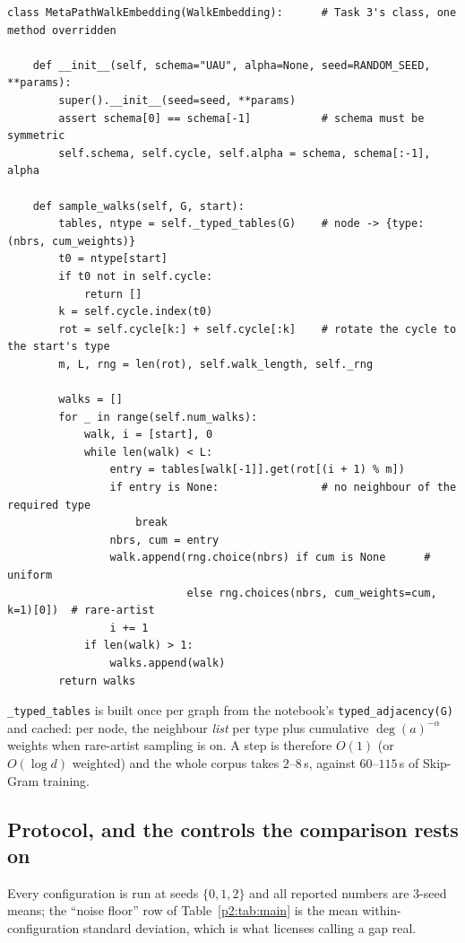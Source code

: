 \begin{lstlisting}[style=p2code,caption={The meta-path sampler. Everything else --- training, link
predictor, country classifier --- is unchanged from Task 3.},captionpos=b,label=p2:lst:sampler]
class MetaPathWalkEmbedding(WalkEmbedding):      # Task 3's class, one method overridden

    def __init__(self, schema="UAU", alpha=None, seed=RANDOM_SEED, **params):
        super().__init__(seed=seed, **params)
        assert schema[0] == schema[-1]           # schema must be symmetric
        self.schema, self.cycle, self.alpha = schema, schema[:-1], alpha

    def sample_walks(self, G, start):
        tables, ntype = self._typed_tables(G)    # node -> {type: (nbrs, cum_weights)}
        t0 = ntype[start]
        if t0 not in self.cycle:
            return []
        k = self.cycle.index(t0)
        rot = self.cycle[k:] + self.cycle[:k]    # rotate the cycle to the start's type
        m, L, rng = len(rot), self.walk_length, self._rng

        walks = []
        for _ in range(self.num_walks):
            walk, i = [start], 0
            while len(walk) < L:
                entry = tables[walk[-1]].get(rot[(i + 1) % m])
                if entry is None:                # no neighbour of the required type
                    break
                nbrs, cum = entry
                walk.append(rng.choice(nbrs) if cum is None      # uniform
                            else rng.choices(nbrs, cum_weights=cum, k=1)[0])  # rare-artist
                i += 1
            if len(walk) > 1:
                walks.append(walk)
        return walks
\end{lstlisting}

\noindent
\texttt{\_typed\_tables} is built once per graph from the notebook's
\texttt{typed\_adjacency(G)} and cached: per node, the neighbour \emph{list} per type plus
cumulative $\deg(a)^{-\alpha}$ weights when rare-artist sampling is on.  A step is therefore
$O(1)$ (or $O(\log d)$ weighted) and the whole corpus takes $2$--$8\,$s, against $60$--$115\,$s
of Skip-Gram training.

\subsection{Protocol, and the controls the comparison rests on}
\label{p2:sec:protocol}

Every configuration is run at seeds $\{0,1,2\}$ and all reported numbers are $3$-seed
means; the ``noise floor'' row of Table~\ref{p2:tab:main} is the mean within-configuration
standard deviation, which is what licenses calling a gap real.

